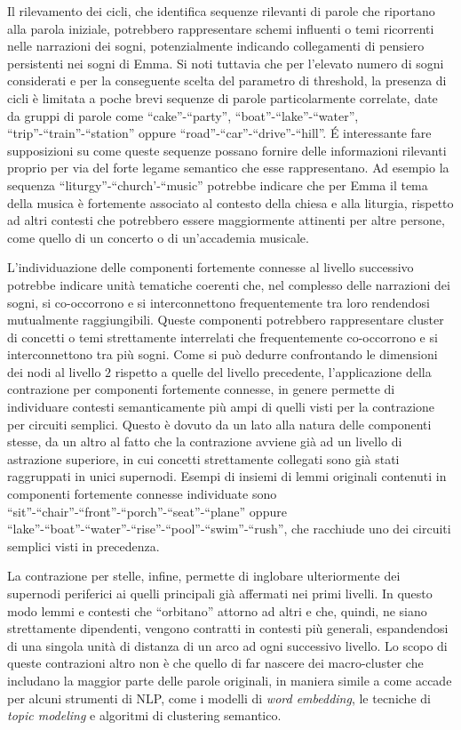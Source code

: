 Il rilevamento dei cicli, che identifica sequenze rilevanti di parole che riportano alla parola iniziale, potrebbero
rappresentare schemi influenti o temi ricorrenti nelle narrazioni dei sogni,
potenzialmente indicando collegamenti di pensiero persistenti nei sogni di Emma.
Si noti tuttavia che per l'elevato numero di sogni considerati e per la conseguente scelta del parametro di threshold,
la presenza di cicli è limitata a poche brevi sequenze di parole particolarmente correlate, date da gruppi di
parole come ``cake''-``party'', ``boat''-``lake''-``water'', ``trip''-``train''-``station'' oppure
``road''-``car''-``drive''-``hill''.
\'E interessante fare supposizioni su come queste sequenze possano fornire delle informazioni rilevanti proprio per
via del forte legame semantico che esse rappresentano.
Ad esempio la sequenza ``liturgy''-``church'-``music'' potrebbe indicare che per Emma il tema della musica è
fortemente associato al contesto della chiesa e alla liturgia, rispetto ad altri contesti che potrebbero
essere maggiormente attinenti per altre persone, come quello di un concerto o di un'accademia musicale.


L'individuazione delle componenti fortemente connesse al livello successivo potrebbe indicare unità tematiche coerenti
che, nel complesso delle narrazioni dei sogni, si co-occorrono e si interconnettono frequentemente tra loro rendendosi
mutualmente raggiungibili.
Queste componenti potrebbero rappresentare cluster di concetti o temi strettamente
interrelati che frequentemente co-occorrono e si interconnettono tra più sogni.
Come si può dedurre confrontando le dimensioni dei nodi al livello $2$ rispetto a quelle del livello precedente,
l'applicazione della contrazione per componenti fortemente connesse, in genere permette di individuare contesti
semanticamente più ampi di quelli visti per la contrazione per circuiti semplici.
Questo è dovuto da un lato alla natura delle componenti stesse, da un altro al fatto che la contrazione avviene
già ad un livello di astrazione superiore, in cui concetti strettamente collegati sono già stati raggruppati in unici
supernodi.
Esempi di insiemi di lemmi originali contenuti in componenti fortemente connesse individuate sono
``sit''-``chair''-``front''-``porch''-``seat''-``plane''
oppure ``lake''-``boat''-``water''-``rise''-``pool''-``swim''-``rush'', che racchiude uno dei circuiti semplici visti
in precedenza.

La contrazione per stelle, infine, permette di inglobare ulteriormente dei supernodi periferici ai quelli principali già
affermati nei primi livelli.
In questo modo lemmi e contesti che ``orbitano'' attorno ad altri e che, quindi,
ne siano strettamente dipendenti, vengono contratti in contesti più generali, espandendosi di una singola unità
di distanza di un arco ad ogni successivo livello.
Lo scopo di queste contrazioni altro non è che quello di far nascere dei macro-cluster che includano la maggior parte
delle parole originali, in maniera simile a come accade per alcuni strumenti di NLP, come i modelli di
\textit{word embedding}, le tecniche di \textit{topic modeling} e algoritmi di clustering semantico.

